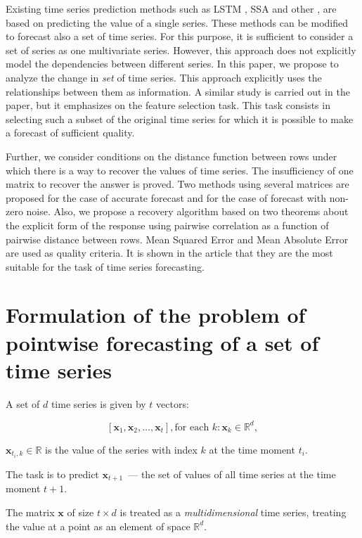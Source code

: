 \documentclass{article}
\begin{document}
	Existing time series prediction methods such as LSTM \cite{LSTM}, SSA \cite{SSA} and other \cite{Biosignals}, \cite{boyd2017multiperiod} are based on predicting the value of a single series. These methods can be modified to forecast also a set of time series. For this purpose, it is sufficient to consider a set of series as one multivariate series. However, this approach does not explicitly model the dependencies between different series. In this paper, we propose to analyze the change in \textit{set} of time series. This approach explicitly uses the relationships between them as information. A similar study is carried out in the \cite{MulticorrelatedQuadratic} paper, but it emphasizes on the feature selection task. This task consists in selecting such a subset of the original time series for which it is possible to make a forecast of sufficient quality.
	
	Further, we consider conditions on the distance function between rows under which there is a way to recover the values of time series. The insufficiency of one matrix to recover the answer is proved. Two methods using several matrices are proposed for the case of accurate forecast and for the case of forecast with non-zero noise. Also, we propose a recovery algorithm based on two theorems about the explicit form of the response using pairwise correlation as a function of pairwise distance between rows. Mean Squared Error and Mean Absolute Error are used as quality criteria. It is shown in the article\cite{jadon2022comprehensive} that they are the most suitable for the task of time series forecasting.

\section{Formulation of the problem of pointwise forecasting of a set of time series}

A set of $d$ time series is given by $t$ vectors:

$$[\mathbf{x}_1, \mathbf{x}_2, \ldots, \mathbf{x}_t], \text{for each } k: \mathbf{x}_k \in \mathbb{R}^d, $$

$\mathbf{x}_{t_i, k} \in \mathbb{R}$ is the value of the series with index $k$ at the time moment $t_i$.

The task is to predict $\mathbf{x}_{t+1}$~--- the set of values of all time series at the time moment $t+1$.

The matrix $\mathbf{x}$ of size $t \times d$ is treated as a \textit{multidimensional} time series, treating the value at a point as an element of space $\mathbb{R}^d$.
\end{document}
